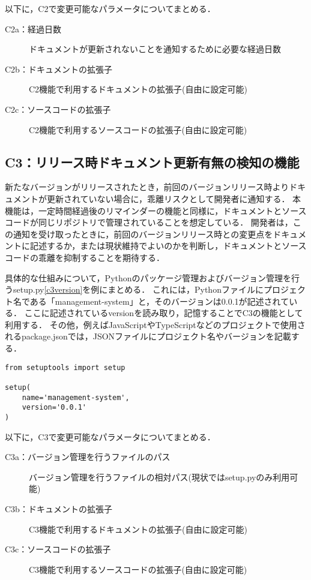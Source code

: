 以下に，C2で変更可能なパラメータについてまとめる．
\begin{description}
    \item[C2a：経過日数] ドキュメントが更新されないことを通知するために必要な経過日数
    \item[C2b：ドキュメントの拡張子] C2機能で利用するドキュメントの拡張子(自由に設定可能)
    \item[C2c：ソースコードの拡張子] C2機能で利用するソースコードの拡張子(自由に設定可能)
\end{description}

\subsection{C3：リリース時ドキュメント更新有無の検知の機能}
\label{c3}
新たなバージョンがリリースされたとき，前回のバージョンリリース時よりドキュメントが更新されていない場合に，乖離リスクとして開発者に通知する．
本機能は，一定時間経過後のリマインダーの機能と同様に，ドキュメントとソースコードが同じリポジトリで管理されていることを想定している．
開発者は，この通知を受け取ったときに，前回のバージョンリリース時との変更点をドキュメントに記述するか，または現状維持でよいのかを判断し，ドキュメントとソースコードの乖離を抑制することを期待する．

具体的な仕組みについて，Pythonのパッケージ管理およびバージョン管理を行うsetup.py\ref{c3version}を例にまとめる．
これには，Pythonファイルにプロジェクト名である「management-system」と，そのバージョンは0.0.1が記述されている．
ここに記述されているversionを読み取り，記憶することでC3の機能として利用する．
その他，例えばJavaScriptやTypeScriptなどのプロジェクトで使用されるpackage.jsonでは，JSONファイルにプロジェクト名やバージョンを記載する．

\begin{lstlisting}[caption=setup.py, label=c3version]
from setuptools import setup

setup(
    name='management-system',
    version='0.0.1'
)    
\end{lstlisting}

以下に，C3で変更可能なパラメータについてまとめる．
\begin{description}
    \item[C3a：バージョン管理を行うファイルのパス] バージョン管理を行うファイルの相対パス(現状ではsetup.pyのみ利用可能)
    \item[C3b：ドキュメントの拡張子] C3機能で利用するドキュメントの拡張子(自由に設定可能)
    \item[C3c：ソースコードの拡張子] C3機能で利用するソースコードの拡張子(自由に設定可能)
\end{description}

